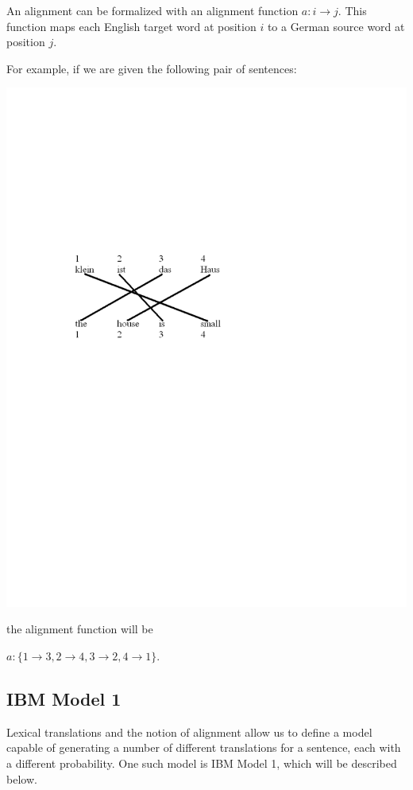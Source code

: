 \documentclass[10pt]{report}
\theoremstyle{plain}
\begin{document}
{An alignment can be formalized with an alignment function $a : i
\rightarrow j$. This function maps each English target word at
position $i$ to a German source word at position $j$.

For example, if we are given the following pair of sentences:

\includegraphics[viewport = 100 400 400 550,clip]{constantin-figure2.pdf}

the alignment function will be

$a:\{1 \rightarrow 3, 2 \rightarrow 4, 3 \rightarrow 2, 4
\rightarrow 1\}$.


\subsection{IBM Model 1\\}

Lexical translations and the notion of alignment allow us to define
a model capable of generating a number of different translations for
a sentence, each with a different probability. One such model is IBM
Model 1, which will be described below.

}
\end{document}
